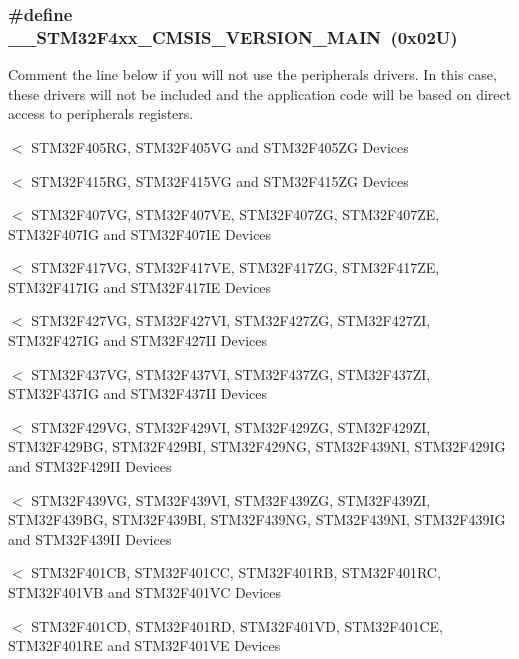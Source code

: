 \subsubsection[{\texorpdfstring{\+\_\+\+\_\+\+S\+T\+M32\+F4xx\+\_\+\+C\+M\+S\+I\+S\+\_\+\+V\+E\+R\+S\+I\+O\+N\+\_\+\+M\+A\+IN}{__STM32F4xx_CMSIS_VERSION_MAIN}}]{\setlength{\rightskip}{0pt plus 5cm}\#define \+\_\+\+\_\+\+S\+T\+M32\+F4xx\+\_\+\+C\+M\+S\+I\+S\+\_\+\+V\+E\+R\+S\+I\+O\+N\+\_\+\+M\+A\+IN~(0x02\+U)}\hypertarget{group___library__configuration__section_gaf867da11218022a14245b854f6be6a40}{}\label{group___library__configuration__section_gaf867da11218022a14245b854f6be6a40}


Comment the line below if you will not use the peripherals drivers. In this case, these drivers will not be included and the application code will be based on direct access to peripherals registers. 

$<$ S\+T\+M32\+F405\+RG, S\+T\+M32\+F405\+VG and S\+T\+M32\+F405\+ZG Devices

$<$ S\+T\+M32\+F415\+RG, S\+T\+M32\+F415\+VG and S\+T\+M32\+F415\+ZG Devices

$<$ S\+T\+M32\+F407\+VG, S\+T\+M32\+F407\+VE, S\+T\+M32\+F407\+ZG, S\+T\+M32\+F407\+ZE, S\+T\+M32\+F407\+IG and S\+T\+M32\+F407\+IE Devices

$<$ S\+T\+M32\+F417\+VG, S\+T\+M32\+F417\+VE, S\+T\+M32\+F417\+ZG, S\+T\+M32\+F417\+ZE, S\+T\+M32\+F417\+IG and S\+T\+M32\+F417\+IE Devices

$<$ S\+T\+M32\+F427\+VG, S\+T\+M32\+F427\+VI, S\+T\+M32\+F427\+ZG, S\+T\+M32\+F427\+ZI, S\+T\+M32\+F427\+IG and S\+T\+M32\+F427\+II Devices

$<$ S\+T\+M32\+F437\+VG, S\+T\+M32\+F437\+VI, S\+T\+M32\+F437\+ZG, S\+T\+M32\+F437\+ZI, S\+T\+M32\+F437\+IG and S\+T\+M32\+F437\+II Devices

$<$ S\+T\+M32\+F429\+VG, S\+T\+M32\+F429\+VI, S\+T\+M32\+F429\+ZG, S\+T\+M32\+F429\+ZI, S\+T\+M32\+F429\+BG, S\+T\+M32\+F429\+BI, S\+T\+M32\+F429\+NG, S\+T\+M32\+F439\+NI, S\+T\+M32\+F429\+IG and S\+T\+M32\+F429\+II Devices

$<$ S\+T\+M32\+F439\+VG, S\+T\+M32\+F439\+VI, S\+T\+M32\+F439\+ZG, S\+T\+M32\+F439\+ZI, S\+T\+M32\+F439\+BG, S\+T\+M32\+F439\+BI, S\+T\+M32\+F439\+NG, S\+T\+M32\+F439\+NI, S\+T\+M32\+F439\+IG and S\+T\+M32\+F439\+II Devices

$<$ S\+T\+M32\+F401\+CB, S\+T\+M32\+F401\+CC, S\+T\+M32\+F401\+RB, S\+T\+M32\+F401\+RC, S\+T\+M32\+F401\+VB and S\+T\+M32\+F401\+VC Devices

$<$ S\+T\+M32\+F401\+CD, S\+T\+M32\+F401\+RD, S\+T\+M32\+F401\+VD, S\+T\+M32\+F401\+CE, S\+T\+M32\+F401\+RE and S\+T\+M32\+F401\+VE Devices

